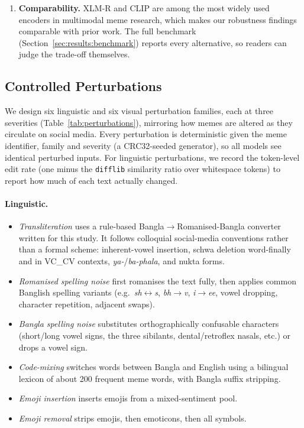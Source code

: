 \begin{enumerate}
  \item \textbf{Comparability.} XLM-R and CLIP are among the most widely used encoders in multimodal meme research,
  which makes our robustness findings comparable with prior work. The full benchmark
  (Section~\ref{sec:results:benchmark}) reports every alternative, so readers can judge the trade-off themselves.
\end{enumerate}

\subsection{Controlled Perturbations}
\label{sec:method:pert}

We design six linguistic and six visual perturbation families, each at three severities
(Table~\ref{tab:perturbations}), mirroring how memes are altered as they circulate on social media. Every
perturbation is deterministic given the meme identifier, family and severity (a CRC32-seeded generator), so all
models see identical perturbed inputs. For linguistic perturbations, we record the token-level edit rate
(one minus the \texttt{difflib} similarity ratio over whitespace tokens) to report how much of each text actually
changed.

\paragraph{Linguistic.}
\begin{itemize}
  \item \emph{Transliteration} uses a rule-based Bangla$\to$Romanised-Bangla converter written for this study. It
  follows colloquial social-media conventions rather than a formal scheme: inherent-vowel insertion, schwa deletion
  word-finally and in VC\_CV contexts, \textit{ya-}/\textit{ba-phala}, and nukta forms.
  \item \emph{Romanised spelling noise} first romanises the text fully, then applies common Banglish spelling
  variants (e.g.\ \textit{sh}$\leftrightarrow$\textit{s}, \textit{bh}$\to$\textit{v}, \textit{i}$\to$\textit{ee},
  vowel dropping, character repetition, adjacent swaps).
  \item \emph{Bangla spelling noise} substitutes orthographically confusable characters (short/long vowel signs,
  the three sibilants, dental/retroflex nasals, etc.) or drops a vowel sign.
  \item \emph{Code-mixing} switches words between Bangla and English using a bilingual lexicon of about 200
  frequent meme words, with Bangla suffix stripping.
  \item \emph{Emoji insertion} inserts emojis from a mixed-sentiment pool.
  \item \emph{Emoji removal} strips emojis, then emoticons, then all symbols.
\end{itemize}

